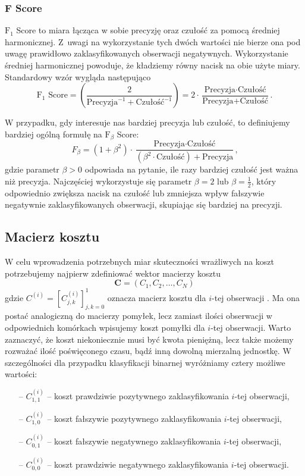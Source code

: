 \documentclass[inzynierska]{pwr_wmat_praca_dyplomowa}
\theoremstyle{plain}
\numberwithin{theorem}{chapter}
\theoremstyle{definition}
\numberwithin{theorem}{chapter}
\begin{document}
\subsubsection{F Score}
$\text{F}_1$ Score to miara łącząca w sobie precyzję oraz czułość za pomocą średniej harmonicznej. Z~uwagi na wykorzystanie tych dwóch wartości nie bierze ona pod uwagę prawidłowo zaklasyfikowanych obserwacji negatywnych. Wykorzystanie średniej harmonicznej powoduje, że kładziemy równy nacisk na obie użyte miary. Standardowy wzór wygląda następująco
$$ \text{F}_1 \text{ Score} = \left(\frac{2}{\text{Precyzja}^{-1} + \text{Czułość}^{-1}}\right) = 2 \cdot \frac{\text{Precyzja} \cdot \text{Czułość}}{\text{Precyzja} + \text{Czułość}} \text{.}$$

W przypadku, gdy interesuje nas bardziej precyzja lub czułość, to definiujemy bardziej ogólną formułę na $\text{F}_{\beta}$ Score:
$$ F_{\beta} = (1 + \beta^2) \cdot \frac{\text{Precyzja} \cdot \text{Czułość}}{(\beta^2 \cdot \text{Czułość}) + \text{Precyzja}} \text{,}$$
gdzie parametr $\beta>0$ odpowiada na pytanie, ile razy bardziej czułość jest ważna niż precyzja. Najczęściej wykorzystuje się parametr $\beta = 2$ lub $\beta = \frac{1}{2}$, który odpowiednio zwiększa nacisk na czułość lub zmniejsza wpływ fałszywie negatywnie zaklasyfikowanych obserwacji, skupiając się bardziej na precyzji.

\subsection{Macierz kosztu}
\label{sec:macierz-kosztu}
W celu wprowadzenia potrzebnych miar skuteczności wrażliwych na koszt potrzebujemy najpierw zdefiniować wektor macierzy kosztu
$$ \boldsymbol{C} = (C_1, C_2, \dots, C_N) $$
gdzie $ C^{(i)} = [C^{(i)}_{j,k}]_{j,k=0}^1 $ oznacza macierz kosztu dla $i$-tej obserwacji \cite{CSCCFD, CS-Learning}. Ma ona postać analogiczną do macierzy pomyłek, lecz zamiast ilości obserwacji w odpowiednich komórkach wpisujemy koszt pomyłki dla $i$-tej obserwacji. Warto zaznaczyć, że koszt niekoniecznie musi być kwota pieniężną, lecz także możemy rozważać ilość poświęconego czasu, bądź inną dowolną mierzalną jednostkę. W szczególności dla przypadku klasyfikacji binarnej wyróżniamy cztery możliwe wartości:
\begin{itemize}
	\item[--] $C^{(i)}_{1,1}$ -- koszt prawdziwie pozytywnego zaklasyfikowania $i$-tej obserwacji,
	\item[--] $C^{(i)}_{1,0}$ -- koszt fałszywie pozytywnego zaklasyfikowania $i$-tej obserwacji,
	\item[--] $C^{(i)}_{0,1}$ -- koszt fałszywie negatywnego zaklasyfikowania $i$-tej obserwacji,
	\item[--] $C^{(i)}_{0,0}$ -- koszt prawdziwie negatywnego zaklasyfikowania $i$-tej obserwacji.
\end{itemize}
\end{document}
